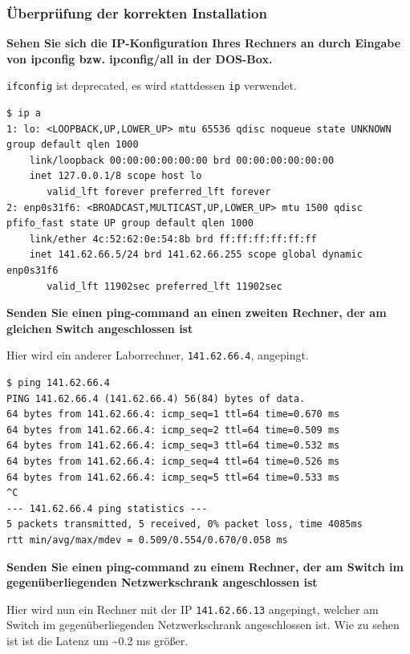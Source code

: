 \hypertarget{uxfcberpruxfcfung-der-korrekten-installation}{%
\subsubsection{Überprüfung der korrekten
Installation}\label{uxfcberpruxfcfung-der-korrekten-installation}}

\textbf{Sehen Sie sich die IP-Konfiguration Ihres Rechners an durch
Eingabe von ipconfig bzw. ipconfig/all in der DOS-Box.}

\texttt{ifconfig} ist deprecated, es wird stattdessen \texttt{ip}
verwendet.

\begin{verbatim}
$ ip a
1: lo: <LOOPBACK,UP,LOWER_UP> mtu 65536 qdisc noqueue state UNKNOWN group default qlen 1000
    link/loopback 00:00:00:00:00:00 brd 00:00:00:00:00:00
    inet 127.0.0.1/8 scope host lo
       valid_lft forever preferred_lft forever
2: enp0s31f6: <BROADCAST,MULTICAST,UP,LOWER_UP> mtu 1500 qdisc pfifo_fast state UP group default qlen 1000
    link/ether 4c:52:62:0e:54:8b brd ff:ff:ff:ff:ff:ff
    inet 141.62.66.5/24 brd 141.62.66.255 scope global dynamic enp0s31f6
       valid_lft 11902sec preferred_lft 11902sec
\end{verbatim}

\textbf{Senden Sie einen ping-command an einen zweiten Rechner, der am
gleichen Switch angeschlossen ist}

Hier wird ein anderer Laborrechner, \texttt{141.62.66.4}, angepingt.

\begin{verbatim}
$ ping 141.62.66.4
PING 141.62.66.4 (141.62.66.4) 56(84) bytes of data.
64 bytes from 141.62.66.4: icmp_seq=1 ttl=64 time=0.670 ms
64 bytes from 141.62.66.4: icmp_seq=2 ttl=64 time=0.509 ms
64 bytes from 141.62.66.4: icmp_seq=3 ttl=64 time=0.532 ms
64 bytes from 141.62.66.4: icmp_seq=4 ttl=64 time=0.526 ms
64 bytes from 141.62.66.4: icmp_seq=5 ttl=64 time=0.533 ms
^C
--- 141.62.66.4 ping statistics ---
5 packets transmitted, 5 received, 0% packet loss, time 4085ms
rtt min/avg/max/mdev = 0.509/0.554/0.670/0.058 ms
\end{verbatim}

\textbf{Senden Sie einen ping-command zu einem Rechner, der am Switch im
gegenüberliegenden Netzwerkschrank angeschlossen ist}

Hier wird nun ein Rechner mit der IP \texttt{141.62.66.13} angepingt,
welcher am Switch im gegenüberliegenden Netzwerkschrank angeschlossen
ist. Wie zu sehen ist ist die Latenz um \textasciitilde0.2 ms größer.


